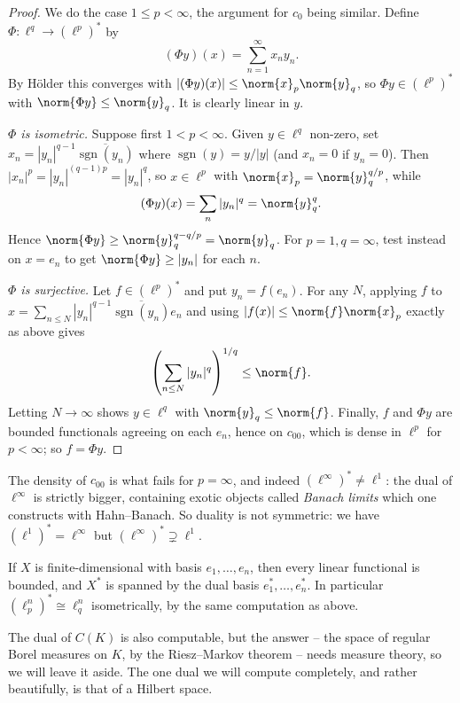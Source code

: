 \documentclass[a4paper]{scrartcl}
\DeclareMathOperator{\sgn}{sgn}
\begin{document}
\begin{proof}
	We do the case $1 \leq p < \infty$, the argument for $c_0$ being similar. Define $\Phi : \ell^q \to (\ell^p)^*$ by
	$$(\Phi y)(x) = \sum_{n=1}^\infty x_n y_n.$$
	By Hölder this converges with $|(\Phi y)(x)| \leq \norm{x}_p \norm{y}_q$, so $\Phi y \in (\ell^p)^*$ with $\norm{\Phi y} \leq \norm{y}_q$. It is clearly linear in $y$.

	\emph{$\Phi$ is isometric.} Suppose first $1 < p < \infty$. Given $y \in \ell^q$ non-zero, set $x_n = |y_n|^{q-1} \overline{\sgn(y_n)}$ where $\sgn(y) = y/|y|$ (and $x_n = 0$ if $y_n = 0$). Then $|x_n|^p = |y_n|^{(q-1)p} = |y_n|^q$, so $x \in \ell^p$ with $\norm{x}_p = \norm{y}_q^{q/p}$, while
	$$(\Phi y)(x) = \sum_n |y_n|^q = \norm{y}_q^q.$$
	Hence $\norm{\Phi y} \geq \norm{y}_q^{q - q/p} = \norm{y}_q$. For $p = 1, q = \infty$, test instead on $x = e_n$ to get $\norm{\Phi y} \geq |y_n|$ for each $n$.

	\emph{$\Phi$ is surjective.} Let $f \in (\ell^p)^*$ and put $y_n = f(e_n)$. For any $N$, applying $f$ to $x = \sum_{n \leq N} |y_n|^{q-1}\overline{\sgn(y_n)}e_n$ and using $|f(x)| \leq \norm{f}\norm{x}_p$ exactly as above gives
	$$\left(\sum_{n \leq N} |y_n|^q\right)^{1/q} \leq \norm{f}.$$
	Letting $N \to \infty$ shows $y \in \ell^q$ with $\norm{y}_q \leq \norm{f}$. Finally, $f$ and $\Phi y$ are bounded functionals agreeing on each $e_n$, hence on $c_{00}$, which is dense in $\ell^p$ for $p < \infty$; so $f = \Phi y$.
\end{proof}

\begin{remark}
	The density of $c_{00}$ is what fails for $p = \infty$, and indeed $(\ell^\infty)^* \neq \ell^1$: the dual of $\ell^\infty$ is strictly bigger, containing exotic objects called \emph{Banach limits} which one constructs with Hahn--Banach. So duality is not symmetric: we have $(\ell^1)^* = \ell^\infty$ but $(\ell^\infty)^* \supsetneq \ell^1$.
\end{remark}

\begin{example}
	If $X$ is finite-dimensional with basis $e_1, \dots, e_n$, then every linear functional is bounded, and $X^*$ is spanned by the dual basis $e_1^*, \dots, e_n^*$. In particular $(\ell_p^n)^* \cong \ell_q^n$ isometrically, by the same computation as above.
\end{example}

The dual of $C(K)$ is also computable, but the answer -- the space of regular Borel measures on $K$, by the Riesz--Markov theorem -- needs measure theory, so we will leave it aside. The one dual we will compute completely, and rather beautifully, is that of a Hilbert space.
\end{document}
